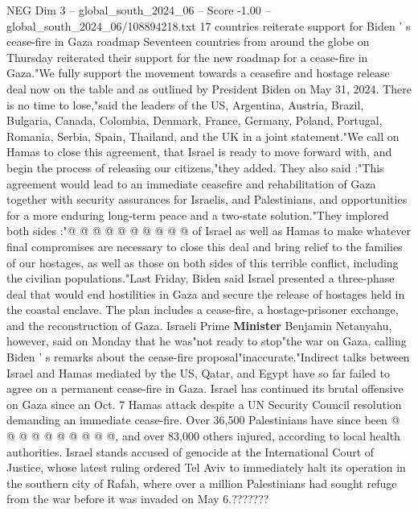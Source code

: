 \begin{textsample}{NEG Dim 3 – global\_south\_2024\_06 – Score -1.00 – global\_south\_2024\_06/108894218.txt}  \label{ex:f3_neg_113}
17 countries reiterate support for Biden ' s cease-fire in Gaza roadmap Seventeen countries from around the globe on Thursday reiterated their support for the new roadmap for a cease-fire in Gaza."We fully support the movement towards a ceasefire and hostage release deal now on the table and as outlined by President Biden on May 31, 2024.
There is no time to lose,"said the leaders of the US, Argentina, Austria, Brazil, Bulgaria, Canada, Colombia, Denmark, France, Germany, Poland, Portugal, Romania, Serbia, Spain, Thailand, and the UK in a joint statement."We call on Hamas to close this agreement, that Israel is ready to move forward with, and begin the process of releasing our citizens,"they added.
They also said :"This agreement would lead to an immediate ceasefire and rehabilitation of Gaza together with security assurances for Israelis, and Palestinians, and opportunities for a more enduring long-term peace and a two-state solution."They implored both sides :"@ @ @ @ @ @ @ @ @ @ of Israel as well as Hamas to make whatever final compromises are necessary to close this deal and bring relief to the families of our hostages, as well as those on both sides of this terrible conflict, including the civilian populations."Last Friday, Biden said Israel presented a three-phase deal that would end hostilities in Gaza and secure the release of hostages held in the coastal enclave.
The plan includes a cease-fire, a hostage-prisoner exchange, and the reconstruction of Gaza.
Israeli Prime \textbf{Minister} Benjamin Netanyahu, however, said on Monday that he was"not ready to stop"the war on Gaza, calling Biden ' s remarks about the cease-fire proposal"inaccurate."Indirect talks between Israel and Hamas mediated by the US, Qatar, and Egypt have so far failed to agree on a permanent cease-fire in Gaza.
Israel has continued its brutal offensive on Gaza since an Oct. 7 Hamas attack despite a UN Security Council resolution demanding an immediate cease-fire.
Over 36,500 Palestinians have since been @ @ @ @ @ @ @ @ @ @, and over 83,000 others injured, according to local health authorities.
Israel stands accused of genocide at the International Court of Justice, whose latest ruling ordered Tel Aviv to immediately halt its operation in the southern city of Rafah, where over a million Palestinians had sought refuge from the war before it was invaded on May 6.???????

\end{textsample}
